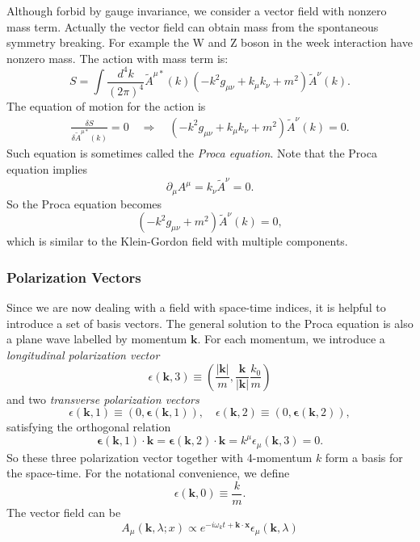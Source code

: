 Although forbid by gauge invariance, we consider a vector field with nonzero mass term.
Actually the vector field can obtain mass from the spontaneous symmetry breaking.
For example the W and Z boson in the week interaction have nonzero mass.
The action with mass term is:
\begin{equation}
	S = \int \frac{d^4 k}{(2\pi)^4} \tilde{A}^{\mu *}(k) \left(-k^2 g_{\mu\nu}+k_\mu k_\nu + m^2 \right) \tilde{A}^\nu(k).
\end{equation}
The equation of motion for the action is
\begin{equation}
\begin{aligned}
	\frac{\delta S}{\delta \tilde{A}^{\mu *}(k)} = 0 
	\quad \Longrightarrow \quad 
	\left(-k^2 g_{\mu\nu}+k_\mu k_\nu + m^2 \right) \tilde{A}^\nu(k) = 0.
\end{aligned}
\end{equation}
Such equation is sometimes called the \textit{Proca equation}.
Note that the Proca equation implies
\begin{equation}
	\partial_\mu A^\mu = k_\nu \tilde{A}^\nu = 0.
\end{equation}
So the Proca equation becomes
\begin{equation}
	\left(-k^2 g_{\mu\nu} + m^2 \right) \tilde{A}^\nu(k) = 0,
\end{equation}
which is similar to the Klein-Gordon field with multiple components.

\subsubsection{Polarization Vectors}
Since we are now dealing with a field with space-time indices, it is helpful to introduce a set of basis vectors.
The general solution to the Proca equation is also a plane wave labelled by momentum $\bm k$.
For each momentum, we introduce a \textit{longitudinal polarization vector}
\begin{equation}
	\epsilon(\bm k,3) \equiv \left(\frac{|\bm k|}{m}, \frac{\bm k}{|\bm k|}\frac{k_0}{m} \right)
\end{equation}
and two \textit{transverse polarization vectors}
\begin{equation}
	\epsilon(\bm k, 1) \equiv (0, \bm \epsilon(\bm k, 1)), \quad
	\epsilon(\bm k, 2) \equiv (0, \bm \epsilon(\bm k, 2)),
\end{equation}
satisfying the orthogonal relation
\begin{equation}
	\bm \epsilon(\bm k, 1)\cdot \bm k = \bm \epsilon(\bm k, 2)\cdot \bm k = k^\mu \epsilon_\mu(\bm k, 3) = 0.
\end{equation}
So these three polarization vector together with 4-momentum $k$ form a basis for the space-time.
For the notational convenience, we define
\begin{equation}
	\epsilon(\bm k,0) \equiv \frac{k}{m}.
\end{equation}
The vector field can be 
\begin{equation}
	A_\mu(\bm k, \lambda; x) \propto e^{-i\omega_k t + \bm k \cdot \bm x} \epsilon_\mu(\bm k, \lambda)
\end{equation}

